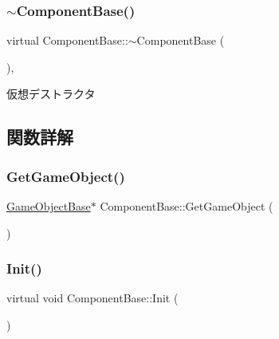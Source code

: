 \subsubsection{\texorpdfstring{$\sim$\+Component\+Base()}{~ComponentBase()}}
{\footnotesize\ttfamily virtual Component\+Base\+::$\sim$\+Component\+Base (\begin{DoxyParamCaption}{ }\end{DoxyParamCaption})\hspace{0.3cm}{\ttfamily [inline]}, {\ttfamily [virtual]}}



仮想デストラクタ 



\subsection{関数詳解}
\mbox{\label{class_component_base_a0ac0d71aeeb768401f34a2e780b1e25d}} 
\subsubsection{\texorpdfstring{Get\+Game\+Object()}{GetGameObject()}}
{\footnotesize\ttfamily \mbox{\hyperlink{class_game_object_base}{Game\+Object\+Base}}$\ast$ Component\+Base\+::\+Get\+Game\+Object (\begin{DoxyParamCaption}{ }\end{DoxyParamCaption})\hspace{0.3cm}{\ttfamily [inline]}}

\mbox{\label{class_component_base_a125939d6befe42f28886a6523e86b18b}} 
\subsubsection{\texorpdfstring{Init()}{Init()}}
{\footnotesize\ttfamily virtual void Component\+Base\+::\+Init (\begin{DoxyParamCaption}{ }\end{DoxyParamCaption})\hspace{0.3cm}{\ttfamily [pure virtual]}}



